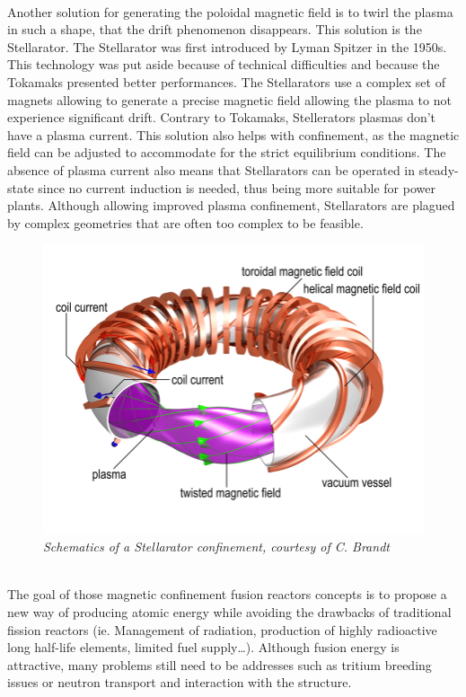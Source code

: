 \\
\break
\normalsize{\indent Another solution for generating the poloidal magnetic field is to twirl the plasma in such a shape, that the drift phenomenon disappears. This solution is the Stellarator. The Stellarator was first introduced by Lyman Spitzer in the 1950s. This technology was put aside because of technical difficulties and because the Tokamaks presented better performances. The Stellarators use a complex set of magnets allowing to generate a precise magnetic field allowing the plasma to not experience significant drift. Contrary to Tokamaks, Stellerators plasmas don’t have a plasma current. This solution also helps with confinement, as the magnetic field can be adjusted to accommodate for the strict equilibrium conditions. The absence of plasma current also means that Stellarators can be operated in steady-state since no current induction is needed, thus being more suitable for power plants. Although allowing improved plasma confinement, Stellarators are plagued by complex geometries that are often too complex to be feasible.}
\begin{figure}[h!]
    \centering
    \includegraphics[width=.6\textwidth]{figures/fig_3.png}
    \caption{\it Schematics of a Stellarator confinement, courtesy of C. Brandt}
\end{figure}
\\
\normalsize{\indent The goal of those magnetic confinement fusion reactors concepts is to propose a new way of producing atomic energy while avoiding the drawbacks of traditional fission reactors (ie. Management of radiation, production of highly radioactive long half-life elements, limited fuel supply…). Although fusion energy is attractive, many problems still need to be addresses such as tritium breeding issues or neutron transport and interaction with the structure.}
